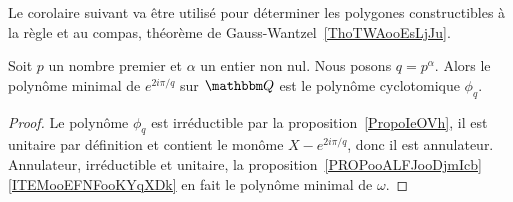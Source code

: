 Le corolaire suivant va être utilisé pour déterminer les polygones constructibles à la règle et au compas, théorème de Gauss-Wantzel~\ref{ThoTWAooEsLjJu}.
\begin{corollary}   \label{CorKRTooTJtyvP}
    Soit \( p\) un nombre premier et \( \alpha\) un entier non nul. Nous posons \( q=p^{\alpha}\). Alors le polynôme minimal de \(  e^{2 i\pi/q}\) sur \( \eQ\) est le polynôme cyclotomique \( \phi_q\).
\end{corollary}

\begin{proof}
    Le polynôme \( \phi_q\) est irréductible par la proposition~\ref{PropoIeOVh}, il est unitaire par définition et contient le monôme \( X- e^{2i\pi/q}\), donc il est annulateur. Annulateur, irréductible et unitaire, la proposition~\ref{PROPooALFJooDjmIcb}\ref{ITEMooEFNFooKYqXDk} en fait le polynôme minimal de \( \omega\).
\end{proof}

